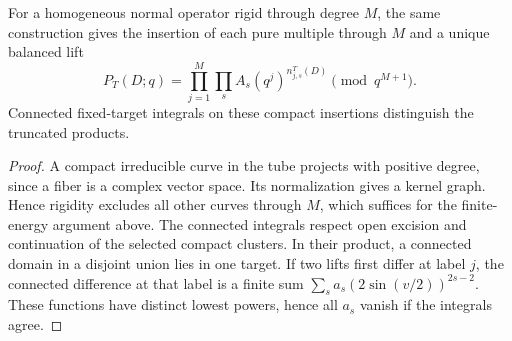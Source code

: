 \begin{corollary}\label{cor:cutoff}
For a homogeneous normal operator rigid through degree $M$, the same
construction gives the insertion of each pure multiple through $M$
and a unique balanced lift
\[
 P_T(D;q)=\prod_{j=1}^M\prod_s A_s(q^j)^{n^T_{j,s}(D)}
          \pmod {q^{M+1}} .
\]
Connected fixed-target integrals on these compact insertions
distinguish the truncated products.
\end{corollary}
\begin{proof}
A compact irreducible curve in the tube projects with positive degree,
since a fiber is a complex vector space. Its normalization gives a
kernel graph. Hence rigidity excludes all other curves through $M$,
which suffices for the finite-energy argument above. The connected
integrals respect open excision and continuation of the selected
compact clusters. In their product, a connected domain in a disjoint
union lies in one target. If two lifts first differ at label $j$, the
connected difference at that label is a finite sum
$\sum_s a_s(2\sin(v/2))^{2s-2}$. These functions have distinct
lowest powers, hence all $a_s$ vanish if the integrals agree.
\end{proof}
